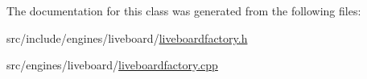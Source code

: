 The documentation for this class was generated from the following files\+:\begin{DoxyCompactItemize}
\item 
src/include/engines/liveboard/\mbox{\hyperlink{liveboardfactory_8h}{liveboardfactory.\+h}}\item 
src/engines/liveboard/\mbox{\hyperlink{liveboardfactory_8cpp}{liveboardfactory.\+cpp}}\end{DoxyCompactItemize}
